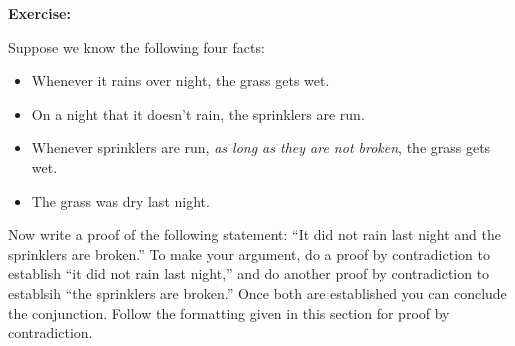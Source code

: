\documentclass[12pt]{article}
\newcommand{\ex}[1]{\textbf{Exercise:}\begin{adjustwidth}{2em}{}#1\end{adjustwidth}}
\def\pA{\Phi}
\def\pB{\Psi}
\begin{document}
\ex{
Suppose we know the following four facts:
\begin{itemize}
\item Whenever it rains over night, the grass gets wet. 
\item On a night that it doesn't rain, the sprinklers are run.
\item Whenever sprinklers are run, \emph{as long as they are not broken}, the grass gets wet.
\item The grass was dry last night.
\end{itemize}
Now write a proof of the following statement: ``It did not rain last night and the sprinklers are broken.''
To make your argument,
do a proof by contradiction to establish ``it did not rain last night,''
and do another proof by contradiction to establsih ``the sprinklers are broken.''
Once both are established you can conclude the conjunction.
Follow the formatting given in this section for proof by contradiction.
}





\newcommand{\truthtablefour}[5]{
\begin{tabular}{|c|c|c|}
\hline
$\pA$ & $\pB$ & #1 \\ \hline
F     & F  & #2   \\ \hline
F     & T  & #3   \\ \hline
T     & F  & #4   \\ \hline
T     & T  & #5   \\ \hline
\end{tabular}
}

\newcommand{\truthtabletwo}[3]{
\begin{tabular}{|c|c|}
\hline
$\pA$ & #1 \\ \hline
F     & #2   \\ \hline
T     & #3   \\ \hline
\end{tabular}
}


\def\sp{\hspace{1em}}
\end{document}
